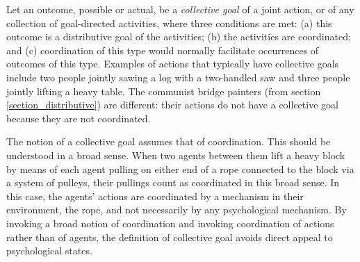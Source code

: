 \documentclass[12pt,a4paper]{extarticle}
\begin{document}
Let an outcome, possible or actual, be a \emph{collective goal \label{df_collective_goal}} of a joint action, or of any collection of goal-directed activities, where three conditions are met: 
	(a) this outcome is a distributive goal of the activities; 
	(b) the activities are coordinated; and 
	(c)  coordination of this type would normally  facilitate occurrences of outcomes of this type.  
Examples of actions  that typically have collective goals include two people jointly sawing a log with a two-handled saw and  
three people jointly lifting a heavy table.
The communist bridge painters (from section \vref{section_distributive}) are different: their actions do not have a collective goal because they are not coordinated.

The notion of a collective goal assumes that of coordination.  This should be understood in a broad sense.  
When two agents between them lift a heavy block by means of each agent pulling on either end of a rope connected to the block via a system of pulleys, their pullings count as coordinated in this broad sense.  
In this case, the agents' actions are coordinated by a mechanism in their environment, the rope, and not necessarily by any psychological mechanism.  
By invoking a broad notion of coordination 
and invoking coordination of actions rather than of agents,
the definition of collective goal avoids direct appeal to psychological states.
\end{document}

